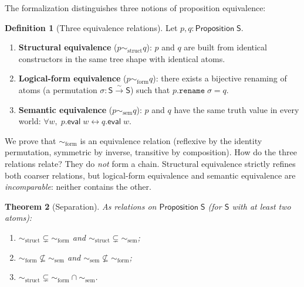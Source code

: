 \documentclass[jsl,bibother]{asl}
\newtheorem{theorem}{Theorem}[section]
\theoremstyle{definition}
\newtheorem{definition}[theorem]{Definition}
\theoremstyle{remark}
\newcommand{\Sach}{\mathsf{S}}
\newcommand{\eval}{\mathsf{eval}}
\newcommand{\structEq}{\sim_{\mathrm{struct}}}
\newcommand{\formEq}{\sim_{\mathrm{form}}}
\newcommand{\semEq}{\sim_{\mathrm{sem}}}
\begin{document}
The formalization distinguishes three notions of proposition
equivalence:

\begin{definition}[Three equivalence relations]
\label{def:hierarchy}
Let $p, q : \mathsf{Proposition}\;\Sach$.
\begin{enumerate}[nosep]
  \item \textbf{Structural equivalence} ($p \structEq q$):
    $p$ and $q$ are built from identical constructors in the
    same tree shape with identical atoms.
  \item \textbf{Logical-form equivalence} ($p \formEq q$):
    there exists a bijective renaming of atoms (a permutation
    $\sigma : \Sach \xrightarrow{\sim} \Sach$) such that
    $p.\mathtt{rename}\;\sigma = q$.
  \item \textbf{Semantic equivalence} ($p \semEq q$):
    $p$ and $q$ have the same truth value in every world:
    $\forall w,\; p.\eval\;w \leftrightarrow q.\eval\;w$.
\end{enumerate}
\end{definition}

\noindent
We prove that $\formEq$ is an equivalence relation (reflexive by
the identity permutation, symmetric by inverse, transitive by
composition).  How do the three relations relate?  They do
\emph{not} form a chain.  Structural equivalence strictly refines
both coarser relations, but logical-form equivalence and semantic
equivalence are \emph{incomparable}: neither contains the other.

\begin{theorem}[Separation]
\label{thm:hierarchy}
As relations on $\mathsf{Proposition}\;\Sach$ (for $\Sach$ with
at least two atoms):
\begin{enumerate}[nosep]
  \item $\structEq \subsetneq \formEq$ and
        $\structEq \subsetneq \semEq$;
  \item $\formEq \not\subseteq \semEq$ and
        $\semEq \not\subseteq \formEq$;
  \item $\structEq \subsetneq \formEq \cap \semEq$.
\end{enumerate}
\end{theorem}
\end{document}
